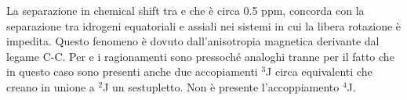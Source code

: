 La separazione in chemical shift tra  e  che è circa 0.5 ppm, concorda con la separazione tra idrogeni equatoriali e assiali nei sistemi in cui la libera rotazione è impedita. Questo fenomeno è dovuto dall'anisotropia magnetica derivante dal legame C-C. Per  e  i ragionamenti sono pressoché analoghi tranne per il fatto che in questo caso sono presenti anche due accopiamenti ${}^3$J circa equivalenti che creano in unione a ${}^2$J un sestupletto. Non è presente l'accoppiamento ${}^4$J.

